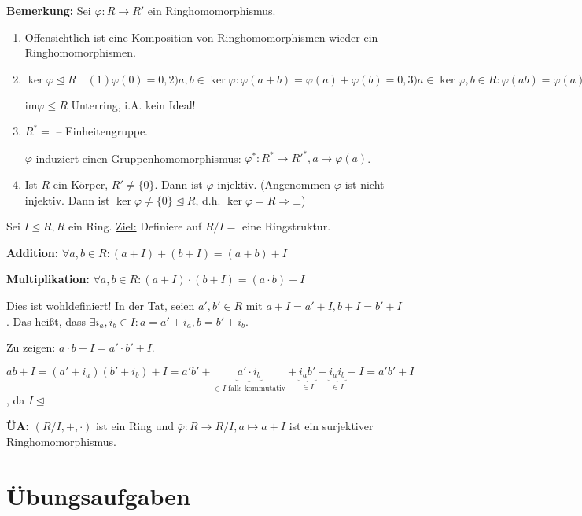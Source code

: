 \documentclass[10pt,a4paper]{article}
\begin{document}
\textbf{Bemerkung:} Sei $\varphi : R \to R'$ ein Ringhomomorphismus.\begin{enumerate} 
\item Offensichtlich ist eine Komposition von Ringhomomorphismen wieder ein Ringhomomorphismen. 
\item $\ker \varphi \trianglelefteq R \quad (1) \varphi(0) = 0, 2) a,b \in \ker \varphi: \varphi(a+b) = \varphi(a) + \varphi(b) = 0, 3) a \in \ker \varphi, b \in R: \varphi (ab) = \varphi(a) \varphi(b) = 0 \cdot \varphi(b) = 0)$

im$\varphi \leqslant R$ Unterring, i.A. kein Ideal!

\item $R^* =$ -- Einheitengruppe.

$\varphi$ induziert einen Gruppenhomomorphismus: $\varphi^*: R^* \to {R'}^*, a \mapsto \varphi(a)$.

\item Ist $R$ ein Körper, $R' \neq \{0\}$. Dann ist $\varphi$ injektiv. (Angenommen $\varphi$ ist nicht injektiv. Dann ist $\ker \varphi \neq \{0\} \trianglelefteq R$, d.h. $\ker \varphi = R \Rightarrow \bot$)
\end{enumerate}

Sei $I \trianglelefteq R, R$ ein Ring. \underline{Ziel:} Definiere auf $R / I = $  eine Ringstruktur.

\textbf{Addition:} $\forall a,b \in R: (a+I) + (b+I) = (a+b)+I$

\textbf{Multiplikation:} $\forall a,b \in R: (a+I) \cdot (b+I) = (a\cdot b)+I$

Dies ist wohldefiniert! In der Tat, seien $a', b' \in R$ mit $a+I = a' + I, b+I = b' + I$. Das heißt, dass $\exists i_a, i_b \in I: a = a' + i_a, b = b' + i_b.$ 

Zu zeigen: $a \cdot b + I = a' \cdot b' + I$.

$ab+I = (a' + i_a) (b' + i_b) + I = a'b' + \underbrace{a' \cdot i_b}_{\in I \text{ falls kommutativ}} + \underbrace{i_a b'}_{\in I} + \underbrace{i_a i_b}_{\in I} + I = a'b' + I$, da $I \trianglelefteq$

\textbf{ÜA:} $(R/I, +, \cdot)$ ist ein Ring und $\bar{\varphi}: R \to R/I, a \mapsto a + I$ ist ein surjektiver Ringhomomorphismus.


\newpage
\section{Übungsaufgaben}
\end{document}
